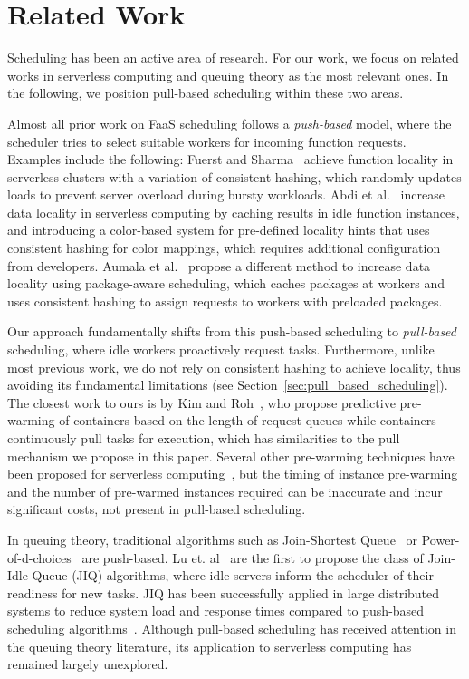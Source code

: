 \section{Related Work}
\label{sec:related_work}



Scheduling has been an active area of research. For our work, we focus on related works in serverless computing and queuing theory as the most relevant ones. In the following, we position pull-based scheduling within these two areas.

Almost all prior work on FaaS scheduling follows a \textit{push-based} model, where the scheduler tries to select suitable workers for incoming function requests. Examples include the following:
Fuerst and Sharma~\cite{fuerst2022locality} achieve function locality in serverless clusters with a variation of consistent hashing, which randomly updates loads to prevent server overload during bursty workloads.
Abdi et al.~\cite{abdi2023palette} increase data locality in serverless computing by caching results in idle function instances, and introducing a color-based system for pre-defined locality hints that uses consistent hashing for color mappings, which requires additional configuration from developers.
Aumala et al.~\cite{aumala2019beyond} propose a different method to increase data locality using package-aware scheduling, which caches packages at workers and uses consistent hashing to assign requests to workers with preloaded packages.

Our approach fundamentally shifts from this push-based scheduling to \textit{pull-based} scheduling, where idle workers proactively request tasks. Furthermore, unlike most previous work, we do not rely on consistent hashing to achieve locality, thus avoiding its fundamental limitations (see Section~\ref{sec:pull_based_scheduling}).
The closest work to ours is by Kim and Roh~\cite{kim2021scheduling}, who propose predictive pre-warming of containers based on the length of request queues while containers continuously pull tasks for execution, which has similarities to the pull mechanism we propose in this paper. Several other pre-warming techniques have been proposed for serverless computing~\cite{roy2022icebreaker, agarwal2021reinforcement, silva2020prebaking}, but the timing of instance pre-warming and the number of pre-warmed instances required can be inaccurate and incur significant costs, not present in pull-based scheduling.


In queuing theory, traditional algorithms such as Join-Shortest Queue~\cite{eschenfeldt2018join} or Power-of-d-choices~\cite{hellemans2018power} are push-based.
Lu et. al~\cite{lu2011join} are the first to propose the class of Join-Idle-Queue (JIQ) algorithms, where idle servers inform the scheduler of their readiness for new tasks. JIQ has been successfully applied in large distributed systems to reduce system load and response times compared to push-based scheduling algorithms~\cite{wang2018distributed}. Although pull-based scheduling has received attention in the queuing theory literature, its application to serverless computing has remained largely unexplored.